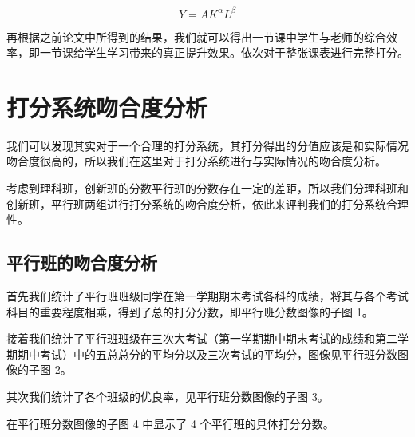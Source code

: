 \documentclass[a4paper]{article}
\begin{document}
   \begin{equation}
   Y=AK^\alpha L^\beta
   \end{equation}

   再根据之前论文中所得到的结果，我们就可以得出一节课中学生与老师的综合效率，即一节课给学生学习带来的真正提升效果。依次对于整张课表进行完整打分。

\clearpage

\section{打分系统吻合度分析}

 我们可以发现其实对于一个合理的打分系统，其打分得出的分值应该是和实际情况吻合度很高的，所以我们在这里对于打分系统进行与实际情况的吻合度分析。

 考虑到理科班，创新班的分数平行班的分数存在一定的差距，所以我们分理科班和创新班，平行班两组进行打分系统的吻合度分析，依此来评判我们的打分系统合理性。

 \subsection{平行班的吻合度分析}

  首先我们统计了平行班班级同学在第一学期期末考试各科的成绩，将其与各个考试科目的重要程度相乘，得到了总的打分分数，即平行班分数图像的子图 1。

  接着我们统计了平行班班级在三次大考试（第一学期期中期末考试的成绩和第二学期期中考试）中的五总总分的平均分以及三次考试的平均分，图像见平行班分数图像的子图 2。

  其次我们统计了各个班级的优良率，见平行班分数图像的子图 3。

  在平行班分数图像的子图 4 中显示了 4 个平行班的具体打分分数。
\end{document}
